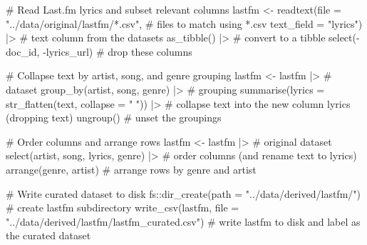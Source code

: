 \documentclass[
  letterpaper,
]{latex/krantz}
\newenvironment{Shaded}{\begin{snugshade}}{\end{snugshade}}
\newcommand{\AttributeTok}[1]{\textcolor[rgb]{0.40,0.45,0.13}{#1}}
\newcommand{\CommentTok}[1]{\textcolor[rgb]{0.37,0.37,0.37}{#1}}
\newcommand{\FunctionTok}[1]{\textcolor[rgb]{0.28,0.35,0.67}{#1}}
\newcommand{\NormalTok}[1]{\textcolor[rgb]{0.00,0.23,0.31}{#1}}
\newcommand{\OtherTok}[1]{\textcolor[rgb]{0.00,0.23,0.31}{#1}}
\newcommand{\SpecialCharTok}[1]{\textcolor[rgb]{0.37,0.37,0.37}{#1}}
\newcommand{\StringTok}[1]{\textcolor[rgb]{0.13,0.47,0.30}{#1}}
\begin{document}
\begin{Shaded}
\begin{Highlighting}[]
\CommentTok{\# Read Last.fm lyrics and subset relevant columns}
\NormalTok{lastfm }\OtherTok{\textless{}{-}} 
  \FunctionTok{readtext}\NormalTok{(}\AttributeTok{file =} \StringTok{"../data/original/lastfm/*.csv"}\NormalTok{, }\CommentTok{\# files to match using *.csv}
           \AttributeTok{text\_field =} \StringTok{"lyrics"}\NormalTok{) }\SpecialCharTok{|\textgreater{}} \CommentTok{\# text column from the datasets}
  \FunctionTok{as\_tibble}\NormalTok{() }\SpecialCharTok{|\textgreater{}} \CommentTok{\# convert to a tibble}
  \FunctionTok{select}\NormalTok{(}\SpecialCharTok{{-}}\NormalTok{doc\_id, }\SpecialCharTok{{-}}\NormalTok{lyrics\_url) }\CommentTok{\# drop these columns}

\CommentTok{\# Collapse text by artist, song, and genre grouping}
\NormalTok{lastfm }\OtherTok{\textless{}{-}} 
\NormalTok{  lastfm }\SpecialCharTok{|\textgreater{}} \CommentTok{\# dataset}
  \FunctionTok{group\_by}\NormalTok{(artist, song, genre) }\SpecialCharTok{|\textgreater{}} \CommentTok{\# grouping}
  \FunctionTok{summarise}\NormalTok{(}\AttributeTok{lyrics =} \FunctionTok{str\_flatten}\NormalTok{(text, }\AttributeTok{collapse =} \StringTok{" "}\NormalTok{)) }\SpecialCharTok{|\textgreater{}}  \CommentTok{\# collapse text into the new column \textasciigrave{}lyrics\textasciigrave{} (dropping \textasciigrave{}text\textasciigrave{})}
  \FunctionTok{ungroup}\NormalTok{() }\CommentTok{\# unset the groupings}

\CommentTok{\# Order columns and arrange rows}
\NormalTok{lastfm }\OtherTok{\textless{}{-}} 
\NormalTok{  lastfm }\SpecialCharTok{|\textgreater{}} \CommentTok{\# original dataset}
  \FunctionTok{select}\NormalTok{(artist, song, lyrics, genre) }\SpecialCharTok{|\textgreater{}} \CommentTok{\# order columns (and rename \textasciigrave{}text\textasciigrave{} to \textasciigrave{}lyrics\textasciigrave{})}
  \FunctionTok{arrange}\NormalTok{(genre, artist) }\CommentTok{\# arrange rows by \textasciigrave{}genre\textasciigrave{} and \textasciigrave{}artist\textasciigrave{}}

\CommentTok{\# Write curated dataset to disk}
\NormalTok{fs}\SpecialCharTok{::}\FunctionTok{dir\_create}\NormalTok{(}\AttributeTok{path =} \StringTok{"../data/derived/lastfm/"}\NormalTok{) }\CommentTok{\# create lastfm subdirectory}
\FunctionTok{write\_csv}\NormalTok{(lastfm, }
          \AttributeTok{file =} \StringTok{"../data/derived/lastfm/lastfm\_curated.csv"}\NormalTok{) }\CommentTok{\# write lastfm to disk and label as the curated dataset}
\end{Highlighting}
\end{Shaded}
\end{document}
